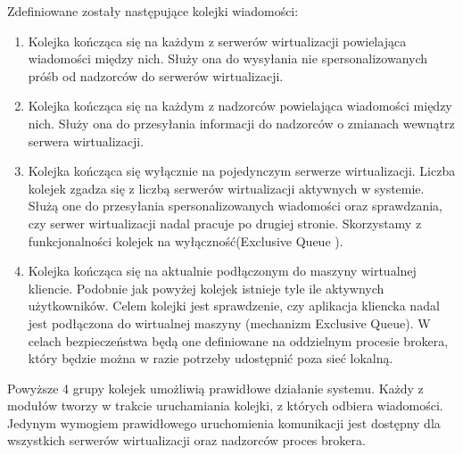 \documentclass[../opis-rozwiazania.tex]{subfiles}
\begin{document}
Zdefiniowane zostały następujące kolejki wiadomości:
\begin{enumerate}[label=(\Roman*)]
    \item \label{modules:broker:queue-virtsrv} Kolejka kończąca się na każdym z serwerów wirtualizacji powielająca wiadomości między nich.
          Służy ona do wysyłania nie spersonalizowanych próśb od nadzorców do serwerów wirtualizacji.
    \item \label{modules:broker:queue-overseers} Kolejka kończąca się na każdym z nadzorców powielająca wiadomości między nich.
          Służy ona do przesyłania informacji do nadzorców o zmianach wewnątrz serwera wirtualizacji.
    \item \label{modules:broker:queue-exclusive} Kolejka kończąca się wyłącznie na pojedynczym serwerze wirtualizacji.
          Liczba kolejek zgadza się z liczbą serwerów wirtualizacji aktywnych w systemie.
          Służą one do przesyłania spersonalizowanych wiadomości oraz sprawdzania, czy serwer wirtualizacji nadal pracuje po drugiej stronie.
          Skorzystamy z funkcjonalności kolejek na wyłączność(Exclusive Queue \parencite{xrdp-clients}).
    \item \label{modules:broker:queue-users} Kolejka kończąca się na aktualnie podłączonym do maszyny wirtualnej kliencie.
          Podobnie jak powyżej kolejek istnieje tyle ile aktywnych użytkowników.
          Celem kolejki jest sprawdzenie, czy aplikacja kliencka nadal jest podłączona do wirtualnej maszyny (mechanizm Exclusive Queue).
          W celach bezpieczeństwa będą one definiowane na oddzielnym procesie brokera, który będzie można w razie potrzeby udostępnić poza sieć lokalną.
\end{enumerate}

Powyższe 4 grupy kolejek umożliwią prawidłowe działanie systemu.
Każdy z modułów tworzy w trakcie uruchamiania kolejki, z których odbiera wiadomości.
Jedynym wymogiem prawidłowego uruchomienia komunikacji jest dostępny dla wszystkich serwerów wirtualizacji oraz nadzorców proces brokera.
\end{document}
